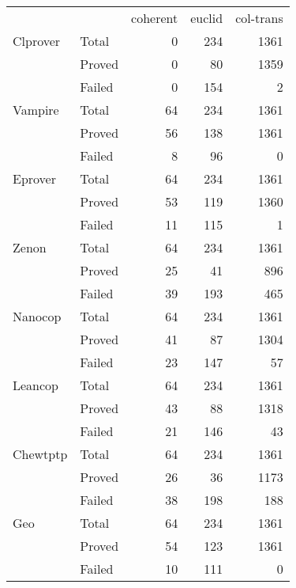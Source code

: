 \documentclass{article}
\begin{document}
\begin{tabular}{llrrr}
 &  &  coherent & euclid & col-trans \\
Clprover & Total &0 & 234 & 1361 \\
      & Proved & 0 & 80 & 1359 \\
      & Failed & 0 & 154 & 2 \\
Vampire & Total &64 & 234 & 1361 \\
      & Proved & 56 & 138 & 1361 \\
      & Failed & 8 & 96 & 0 \\
Eprover & Total &64 & 234 & 1361 \\
      & Proved & 53 & 119 & 1360 \\
      & Failed & 11 & 115 & 1 \\
Zenon & Total &64 & 234 & 1361 \\
      & Proved & 25 & 41 & 896 \\
      & Failed & 39 & 193 & 465 \\
Nanocop & Total &64 & 234 & 1361 \\
      & Proved & 41 & 87 & 1304 \\
      & Failed & 23 & 147 & 57 \\
Leancop & Total &64 & 234 & 1361 \\
      & Proved & 43 & 88 & 1318 \\
      & Failed & 21 & 146 & 43 \\
Chewtptp & Total &64 & 234 & 1361 \\
      & Proved & 26 & 36 & 1173 \\
      & Failed & 38 & 198 & 188 \\
Geo & Total &64 & 234 & 1361 \\
      & Proved & 54 & 123 & 1361 \\
      & Failed & 10 & 111 & 0 \\
\end{tabular}
\end{document}
